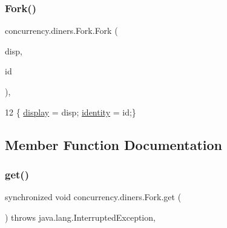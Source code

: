 \subsubsection{\texorpdfstring{Fork()}{Fork()}}
{\footnotesize\ttfamily concurrency.\+diners.\+Fork.\+Fork (\begin{DoxyParamCaption}\item[{\mbox{\hyperlink{classconcurrency_1_1diners_1_1_phil_canvas}{Phil\+Canvas}}}]{disp,  }\item[{int}]{id }\end{DoxyParamCaption})\hspace{0.3cm}{\ttfamily [inline]}, {\ttfamily [package]}}


\begin{DoxyCode}
12     \{ \mbox{\hyperlink{classconcurrency_1_1diners_1_1_fork_a7cb7b2dbd4bc84923557b292b10ac0a9}{display}} = disp; \mbox{\hyperlink{classconcurrency_1_1diners_1_1_fork_a27ae9a29dc069079538565c74931a0ef}{identity}} = id;\}
\end{DoxyCode}


\subsection{Member Function Documentation}
\mbox{\label{classconcurrency_1_1diners_1_1_fork_abf1b23ca61bdc54fce3810309e72b876}} 
\subsubsection{\texorpdfstring{get()}{get()}}
{\footnotesize\ttfamily synchronized void concurrency.\+diners.\+Fork.\+get (\begin{DoxyParamCaption}{ }\end{DoxyParamCaption}) throws java.\+lang.\+Interrupted\+Exception\hspace{0.3cm}{\ttfamily [inline]}, {\ttfamily [package]}}


